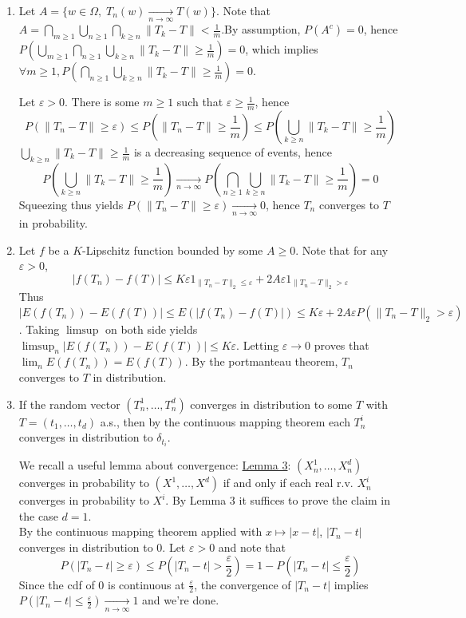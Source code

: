 \documentclass[a4paper,11pt]{article}
\begin{document}
\begin{enumerate}
  \item Let $A = \{w\in \Omega,\; T_n(w)\xrightarrow[n\to \infty]{} T(w)\}$. Note that $A = \bigcap_{m\geq 1} \bigcup_{n\geq 1} \bigcap_{k\geq n} \|T_k-T\|< \frac 1m$.\newline By assumption, $P(A^c)=0$, hence $P(\bigcup_{m\geq 1} \bigcap_{n\geq 1} \bigcup_{k\geq n} \|T_k-T\|\geq \frac 1m) = 0$, which implies $\forall m\geq 1, P(\bigcap_{n\geq 1} \bigcup_{k\geq n} \|T_k-T\|\geq \frac 1m) = 0$.

  Let $\varepsilon >0$. There is some $m\geq 1$ such that $\varepsilon \geq \frac 1m$, hence 
  $$P(\|T_n-T\|\geq \varepsilon) \leq P(\|T_n-T\|\geq \frac 1m) \leq P(\bigcup_{k\geq n} \|T_k-T\|\geq \frac 1m)$$
  $\bigcup_{k\geq n} \|T_k-T\|\geq \frac 1m$ is a decreasing sequence of events, hence $$P(\bigcup_{k\geq n} \|T_k-T\|\geq \frac 1m) \xrightarrow[n\to \infty]{} P(\bigcap_{n\geq 1} \bigcup_{k\geq n} \|T_k-T\|\geq \frac 1m) = 0$$
  Squeezing thus yields $P(\|T_n-T\|\geq \varepsilon) \xrightarrow[n\to \infty]{} 0$, hence $T_n$ converges to $T$ in probability.

  \item Let $f$ be a $K$-Lipschitz function bounded by some $A\geq 0$. Note that for any $\varepsilon >0$, $$|f(T_n)-f(T)|\leq K\varepsilon 1_{\|T_n-T\|_2\leq \varepsilon} + 2A \varepsilon 1_{\|T_n-T\|_2> \varepsilon}$$
  Thus $|E(f(T_n)) - E(f(T))|\leq E(|f(T_n)-f(T)|)\leq K\varepsilon + 2A \varepsilon P(\|T_n-T\|_2> \varepsilon)$.\newline
  Taking $\limsup$ on both side yields $\limsup_n |E(f(T_n)) - E(f(T))|\leq K\varepsilon $. Letting $\varepsilon \to 0$ proves that $\lim_n E(f(T_n)) = E(f(T))$. By the portmanteau theorem, $T_n$ converges to $T$ in distribution.

  \item If the random vector $(T_n^1,\ldots, T_n^d)$ converges in distribution to some $T$ with $T=(t_1,\ldots,t_d)$ a.s., then by the continuous mapping theorem each $T_n^i$ converges in distribution to $\delta_{t_i}$.

  We recall a useful lemma about convergence:\newline
  \underline{Lemma 3}: $(X_n^1,\ldots,X_n^d)$ converges in probability to $(X^1,\ldots,X^d)$ if and only if each real r.v. $X_n^i$ converges in probability to $X^i$. \newline
  By Lemma $3$ it suffices to prove the claim in the case $d=1$.\\
  By the continuous mapping theorem applied with $x\mapsto |x-t|$, $|T_n-t|$ converges in distribution to $0$. Let $\varepsilon >0$ and note that $$P(|T_n-t|\geq \varepsilon) \leq P(|T_n-t|> \frac{\varepsilon}2) = 1-P(|T_n-t|\leq \frac{\varepsilon}2)$$
  Since the cdf of $0$ is continuous at $\displaystyle \frac{\varepsilon}2$, the convergence of $|T_n-t|$ implies $\displaystyle P(|T_n-t|\leq \frac{\varepsilon}2) \xrightarrow[n\to \infty]{} 1$ and we're done.
\end{enumerate}
\end{document}
